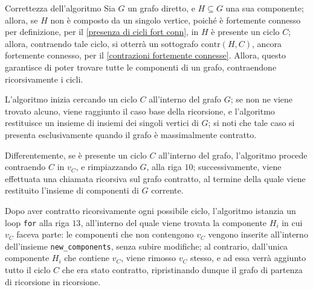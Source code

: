 \documentclass[a4paper, 12pt]{report}
\begin{document}
    \begin{framedobs}{Correttezza dell'algoritmo}
        Sia $G$ un grafo diretto, e $H \subseteq G$ una sua componente; allora, se $H$ non è composto da un singolo vertice, poiché è fortemente connesso per definizione, per il \cref{presenza di cicli fort conn}, in $H$ è presente un ciclo $C$; allora, contraendo tale ciclo, si otterrà un sottografo $\mathrm{contr}(H, C)$, ancora fortemente connesso, per il \cref{contrazioni fortemente connesse}. Allora, questo garantisce di poter trovare tutte le componenti di un grafo, contraendone ricorsivamente i cicli.

        L'algoritmo inizia cercando un ciclo $C$ all'interno del grafo $G$; se non ne viene trovato alcuno, viene raggiunto il caso base della ricorsione, e l'algoritmo restituisce un insieme di insiemi dei singoli vertici di $G$; si noti che tale caso si presenta esclusivamente quando il grafo è massimalmente contratto.

        Differentemente, se è presente un ciclo $C$ all'interno del grafo, l'algoritmo procede contraendo $C$ in $v_C$, e rimpiazzando $G$, alla riga $10$; successivamente, viene effettuata una chiamata ricorsiva sul grafo contratto, al termine della quale viene restituito l'insieme di componenti di $G$ corrente.

        Dopo aver contratto ricorsivamente ogni possibile ciclo, l'algoritmo istanzia un loop \texttt{for} alla riga $13$, all'interno del quale viene trovata la componente $H_i$ in cui $v_C$ faceva parte: le componenti che non contengono $v_C$ vengono inserite all'interno dell'insieme \texttt{new\_components}, senza subire modifiche; al contrario, dall'unica componente $H_i$ che contiene $v_C$, viene rimosso $v_C$ stesso, e ad essa verrà aggiunto tutto il ciclo $C$ che era stato contratto, ripristinando dunque il grafo di partenza di ricorsione in ricorsione.
    \end{framedobs}
\end{document}

